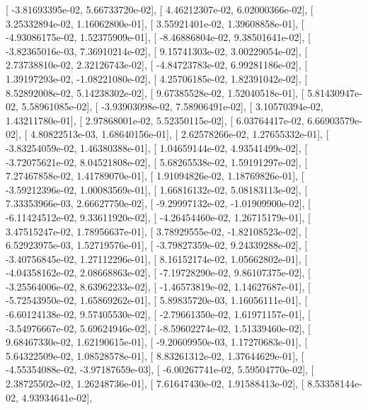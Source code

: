 \documentclass{article}
\begin{document}
       [ -3.81693395e-02,   5.66733720e-02],
       [  4.46212307e-02,   6.02000366e-02],
       [  3.25332894e-02,   1.16062800e-01],
       [  3.55921401e-02,   1.39608858e-01],
       [ -4.93086175e-02,   1.52375909e-01],
       [ -8.46886804e-02,   9.38501641e-02],
       [ -3.82365016e-03,   7.36910214e-02],
       [  9.15741303e-02,   3.00229054e-02],
       [  2.73738810e-02,   2.32126743e-02],
       [ -4.84723783e-02,   6.99281186e-02],
       [  1.39197293e-02,  -1.08221080e-02],
       [  4.25706185e-02,   1.82391042e-02],
       [  8.52892008e-02,   5.14238302e-02],
       [  9.67385528e-02,   1.52040518e-01],
       [  5.81430947e-02,   5.58961085e-02],
       [ -3.93903098e-02,   7.58906491e-02],
       [  3.10570394e-02,   1.43211780e-01],
       [  2.97868001e-02,   5.52350115e-02],
       [  6.03764417e-02,   6.66903579e-02],
       [  4.80822513e-03,   1.68640156e-01],
       [  2.62578266e-02,   1.27655332e-01],
       [ -3.83254059e-02,   1.46380388e-01],
       [  1.04659144e-02,   4.93541499e-02],
       [ -3.72075621e-02,   8.04521808e-02],
       [  5.68265538e-02,   1.59191297e-02],
       [  7.27467858e-02,   1.41789070e-01],
       [  1.91094826e-02,   1.18769826e-01],
       [ -3.59212396e-02,   1.00083569e-01],
       [  1.66816132e-02,   5.08183113e-02],
       [  7.33353966e-03,   2.66627750e-02],
       [ -9.29997132e-02,  -1.01909900e-02],
       [ -6.11424512e-02,   9.33611920e-02],
       [ -4.26454460e-02,   1.26715179e-01],
       [  3.47515247e-02,   1.78956637e-01],
       [  3.78929555e-02,  -1.82108523e-02],
       [  6.52923975e-03,   1.52719576e-01],
       [ -3.79827359e-02,   9.24339288e-02],
       [ -3.40756845e-02,   1.27112296e-01],
       [  8.16152174e-02,   1.05662802e-01],
       [ -4.04358162e-02,   2.08668863e-02],
       [ -7.19728290e-02,   9.86107375e-02],
       [ -3.25564006e-02,   8.63962233e-02],
       [ -1.46573819e-02,   1.14627687e-01],
       [ -5.72543950e-02,   1.65869262e-01],
       [  5.89835720e-03,   1.16056111e-01],
       [ -6.60124138e-02,   9.57405530e-02],
       [ -2.79661350e-02,   1.61971157e-01],
       [ -3.54976667e-02,   5.69624946e-02],
       [ -8.59602274e-02,   1.51339460e-02],
       [  9.68467330e-02,   1.62190615e-01],
       [ -9.20609950e-03,   1.17270683e-01],
       [  5.64322509e-02,   1.08528578e-01],
       [  8.83261312e-02,   1.37644629e-01],
       [ -4.55354088e-02,  -3.97187659e-03],
       [ -6.00267741e-02,   5.59504770e-02],
       [  2.38725502e-02,   1.26248736e-01],
       [  7.61647430e-02,   1.91588413e-02],
       [  8.53358144e-02,   4.93934641e-02],
\end{document}
